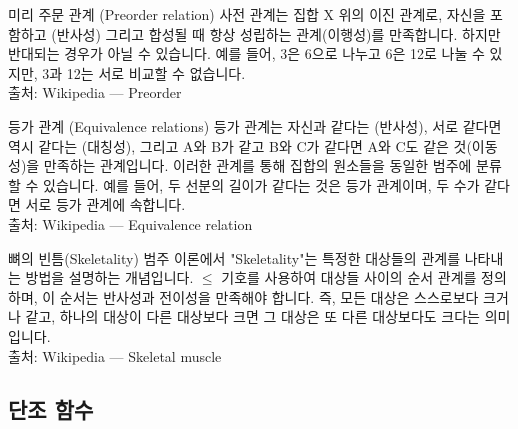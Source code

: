 \documentclass[11pt, a4paper, twoside, openany]{book}
\begin{document}
\begin{deepresearch}{미리 주문 관계 (Preorder relation)}
사전 관계는 집합 X 위의 이진 관계로, 자신을 포함하고 (반사성)  그리고 합성될 때 항상 성립하는 관계(이행성)를 만족합니다. 하지만 반대되는 경우가 아닐 수 있습니다. 예를 들어, 3\hspace{0pt}은 6\hspace{0pt}으로 나누고 6\hspace{0pt}은 12\hspace{0pt}로 나눌 수 있지만, 3\hspace{0pt}과 12\hspace{0pt}는 서로 비교할 수 없습니다.
\\[4pt]{\footnotesize\color{ctgray} 출처: Wikipedia — Preorder}
\end{deepresearch}

\begin{deepresearch}{등가 관계 (Equivalence relations)}
등가 관계는 자신과 같다는 (반사성), 서로 같다면 역시 같다는 (대칭성), 그리고 A\hspace{0pt}와 B\hspace{0pt}가 같고 B\hspace{0pt}와 C\hspace{0pt}가 같다면 A\hspace{0pt}와 C\hspace{0pt}도 같은 것(이동성)을 만족하는 관계입니다. 이러한 관계를 통해 집합의 원소들을 동일한 범주에 분류할 수 있습니다. 예를 들어, 두 선분의 길이가 같다는 것은 등가 관계이며, 두 수가 같다면 서로 등가 관계에 속합니다.
\\[4pt]{\footnotesize\color{ctgray} 출처: Wikipedia — Equivalence relation}
\end{deepresearch}

\begin{deepresearch}{뼈의 빈틈(Skeletality)}
범주 이론에서 "Skeletality"는 특정한 대상들의 관계를 나타내는 방법을 설명하는 개념입니다.  $≤$ 기호를 사용하여 대상들 사이의 순서 관계를 정의하며, 이 순서는 반사성과 전이성을 만족해야 합니다. 즉, 모든 대상은 스스로보다 크거나 같고, 하나의 대상이 다른 대상보다 크면 그 대상은 또 다른 대상보다도 크다는 의미입니다.
\\[4pt]{\footnotesize\color{ctgray} 출처: Wikipedia — Skeletal muscle}
\end{deepresearch}


\subsection{단조 함수}
\label{sec:1-2-3}
\end{document}
